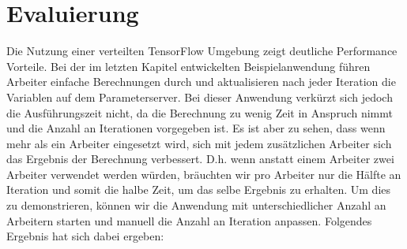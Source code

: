 \section{Evaluierung}
Die Nutzung einer verteilten TensorFlow Umgebung zeigt deutliche Performance Vorteile. Bei der im letzten Kapitel entwickelten Beispielanwendung führen Arbeiter einfache Berechnungen durch und aktualisieren nach jeder Iteration die Variablen auf dem Parameterserver. Bei dieser Anwendung verkürzt sich jedoch die Ausführungszeit nicht, da die Berechnung zu wenig Zeit in Anspruch nimmt und die Anzahl an Iterationen vorgegeben ist. Es ist aber zu sehen, dass wenn mehr als ein Arbeiter eingesetzt wird, sich mit jedem zusätzlichen Arbeiter sich das Ergebnis der Berechnung verbessert. D.h. wenn anstatt einem Arbeiter zwei Arbeiter verwendet werden würden, bräuchten wir pro Arbeiter nur die Hälfte an Iteration und somit die halbe Zeit, um das selbe Ergebnis zu erhalten. Um dies zu demonstrieren, können wir die Anwendung mit  unterschiedlicher Anzahl an Arbeitern starten und manuell die Anzahl an Iteration anpassen. Folgendes Ergebnis hat sich dabei ergeben:

